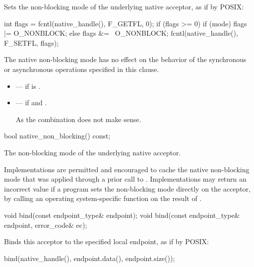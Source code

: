 \begin{itemdescr}
\pnum
\effects Sets the non-blocking mode of the underlying native acceptor, as if by POSIX:
\begin{codeblock}
int flags = fcntl(native_handle(), F_GETFL, 0);
if (flags >= 0)
{
  if (mode)
    flags |= O_NONBLOCK;
  else
    flags &= ~O_NONBLOCK;
  fcntl(native_handle(), F_SETFL, flags);
}
\end{codeblock}


\pnum
 The native non-blocking mode has no effect on the behavior of the synchronous or asynchronous operations specified in this clause.

\pnum
\errors
\begin{itemize}
\item
{} --- if  is .
\item
{} --- if  and . \begin{note} As the combination does not make sense. \end{note}
\end{itemize}
\end{itemdescr}

\begin{itemdecl}
bool native_non_blocking() const;
\end{itemdecl}

\begin{itemdescr}
\pnum
\returns The non-blocking mode of the underlying native acceptor.

\pnum
\remarks Implementations are permitted and encouraged to cache the native non-blocking mode that was applied through a prior call to . Implementations may return an incorrect value if a program sets the non-blocking mode directly on the acceptor, by calling an operating system-specific function on the result of .
\end{itemdescr}

\begin{itemdecl}
void bind(const endpoint_type& endpoint);
void bind(const endpoint_type& endpoint, error_code& ec);
\end{itemdecl}

\begin{itemdescr}
\pnum
\effects Binds this acceptor to the specified local endpoint, as if by POSIX:
\begin{codeblock}
bind(native_handle(), endpoint.data(), endpoint.size());
\end{codeblock}
\end{itemdescr}

